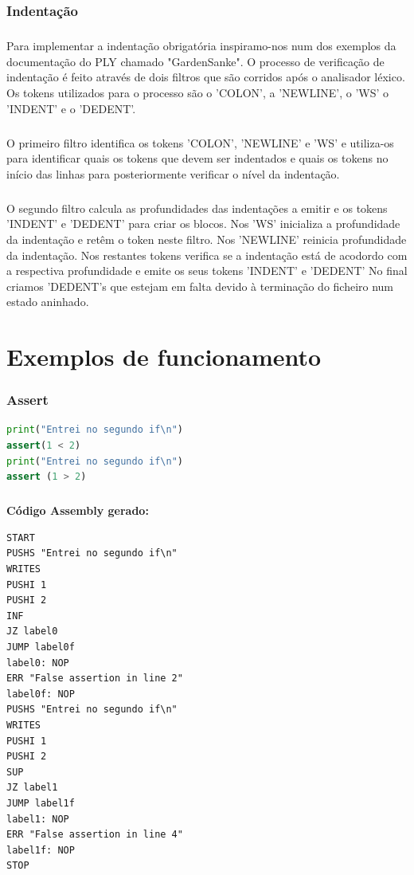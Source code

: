 \documentclass[11pt,a4paper]{report}
\begin{document}
    \subsection{Indentação}
    \paragraph{}
    Para implementar a indentação obrigatória inspiramo-nos num dos exemplos da documentação do PLY chamado "GardenSanke".
    O processo de verificação de indentação é feito através de dois filtros que são corridos após o analisador léxico.
    Os tokens utilizados para o processo são o 'COLON', a 'NEWLINE', o 'WS' o 'INDENT' e o 'DEDENT'.
    \paragraph{}
    O primeiro filtro identifica os tokens 'COLON', 'NEWLINE' e 'WS' e utiliza-os para identificar quais os tokens que devem ser indentados e 
    quais os tokens no início das linhas para posteriormente verificar o nível da indentação.
    \paragraph{}
    O segundo filtro calcula as profundidades das indentações a emitir e os tokens 'INDENT' e 'DEDENT' para criar os blocos.
    Nos 'WS' inicializa a profundidade da indentação e retêm o token neste filtro. Nos 'NEWLINE' reinicia profundidade da indentação.
    Nos restantes tokens verifica se a indentação está de acodordo com a respectiva profundidade e emite os seus tokens 'INDENT' e 'DEDENT'
    No final criamos 'DEDENT's que estejam em falta devido à terminação do ficheiro num estado aninhado.



    \chapter{Exemplos de funcionamento}
    \subsection{Assert}
    \begin{lstlisting}[language=Python]
print("Entrei no segundo if\n")
assert(1 < 2)
print("Entrei no segundo if\n")
assert (1 > 2)
    \end{lstlisting}
    \paragraph{}
    \textbf{Código Assembly gerado:}
    \begin{lstlisting}
START
PUSHS "Entrei no segundo if\n"
WRITES
PUSHI 1
PUSHI 2
INF
JZ label0
JUMP label0f
label0: NOP
ERR "False assertion in line 2"
label0f: NOP
PUSHS "Entrei no segundo if\n"
WRITES
PUSHI 1
PUSHI 2
SUP
JZ label1
JUMP label1f
label1: NOP
ERR "False assertion in line 4"
label1f: NOP
STOP
    \end{lstlisting}
\end{document}
